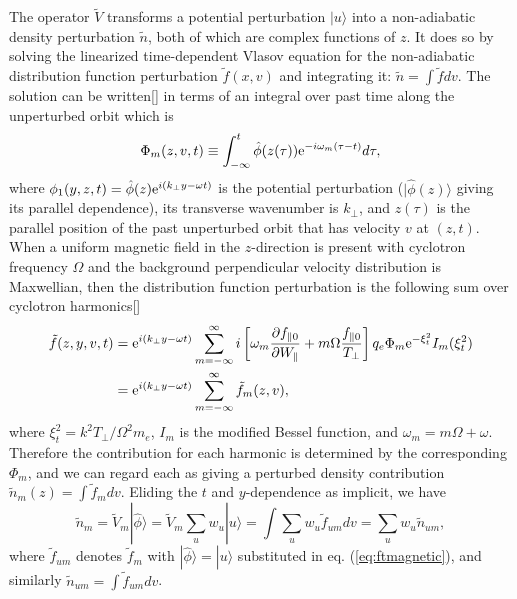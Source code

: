 \documentclass[12pt]{article}
\def\ket#1{|#1\rangle}
\begin{document}
The operator $\tilde{V}$ transforms a potential perturbation $\ket{u}$
into a non-adiabatic density perturbation $\tilde n$, both of which
are complex functions of $z$. It does so by solving the linearized
time-dependent Vlasov equation for the non-adiabatic distribution
function perturbation $\tilde f(x,v)$ and integrating it:
$\tilde n =\int \tilde f dv$. The solution can be written[] in terms of
an integral over past time along the unperturbed orbit which is
\begin{equation}
  \label{eq:phim}
  \Phi_m(z,v,t)\equiv 
  \int_{-\infty}^t \hat\phi(z(\tau)){\rm e}^{-i\omega_m(\tau-t)}d\tau,
\end{equation}
where $\phi_1(y,z,t)=\hat\phi(z){\rm e}^{i(k_\perp y-\omega t)}$ is
the potential perturbation ($\ket{\hat\phi(z)}$ giving its parallel
dependence), its transverse wavenumber is $k_\perp$, and $z(\tau)$ is
the parallel position of the past unperturbed orbit that has velocity
$v$ at $(z,t)$. When a uniform magnetic field in the $z$-direction is
present with cyclotron frequency $\Omega$ and the background
perpendicular velocity distribution is Maxwellian, then the
distribution function perturbation is the following sum over cyclotron
harmonics[]
\begin{equation}\label{eq:ftmagnetic}
  \begin{split}
    \tilde f(z,y,v,t) &=  {\rm e}^{i(k_\perp y-\omega t)}
 \sum_{m=-\infty}^\infty i\left[\omega_m
  {\partial f_{\parallel0}\over \partial W_\parallel}
  +m\Omega {f_{\parallel0}\over T_\perp}\right]
  q_e\Phi_m {\rm e}^{-\xi_t^2}I_m(\xi_t^2)\\
  &= {\rm e}^{i(k_\perp y-\omega t)} \sum_{m=-\infty}^\infty \tilde f_m(z,v),
  \end{split}
\end{equation}
where $\xi_t^2=k^2T_\perp/\Omega^2m_e$, $I_m$ is the modified Bessel
function, and $\omega_m=m\Omega+\omega$. Therefore the contribution
for each harmonic is determined by the corresponding $\Phi_m$, and we
can regard each as giving a perturbed density contribution
$\tilde n_m(z)=\int \tilde f_m dv$. Eliding the $t$ and $y$-dependence
as implicit, we have
\begin{equation}
  \label{eq:13}
\tilde  n_m=\tilde{V}_{m}\ket{\hat\phi}=\tilde{V}_{m}\sum_u w_u\ket{u}=\int \sum_u w_u
  \tilde f_{um} dv=\sum_u w_u \tilde n_{um},
\end{equation}
where $\tilde f_{um}$ denotes $\tilde f_m$ with
$\ket{\hat\phi}=\ket{u}$ substituted in eq. (\ref{eq:ftmagnetic}), and
similarly $\tilde n_{um}=\int \tilde f_{um}dv$.
\end{document}
